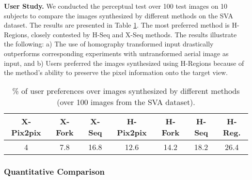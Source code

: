 \documentclass[times,twocolumn,final,authoryear]{elsarticle_modified}
\begin{document}
 
 
\noindent \textbf{User Study.}
We conducted the perceptual test over 100 test images on 10 subjects to compare the images synthesized by different methods on the SVA dataset. The results are presented in Table \ref{tab:user_study}. The most preferred method is H-Regions, closely contested by H-Seq and X-Seq methods. The results illustrate the following: a) The use of homography transformed input drastically outperforms corresponding experiments with untransformed aerial image as input, and b) Users preferred the images synthesized using H-Regions because of the method's ability to preserve the pixel information onto the target view. 



\begin{table}[t]
 \small
  \centering
  \renewcommand{\arraystretch}{.9}
  \renewcommand{\tabcolsep}{1mm}  
  
  \caption{\small \% of user preferences over images synthesized by different methods (over 100 images from the SVA dataset).}
  \vspace{-10pt}
  \label{tab:user_study}
    \begin{tabular}{ccc|ccc|c}
        \toprule
       \small X-Pix2pix & {X-Fork} & {X-Seq} & {H-Pix2pix} & {H-Fork}& {H-Seq}& {H-Reg.}\\
        \midrule
4 & 7.8 & 16.8 & 12.6 & 14.2 & 18.2 & 26.4 \\
        \bottomrule
    \end{tabular}
      \vspace{-15pt}
\end{table}
 
 

\vspace{-5pt}

\subsubsection{Quantitative Comparison}
\end{document}
